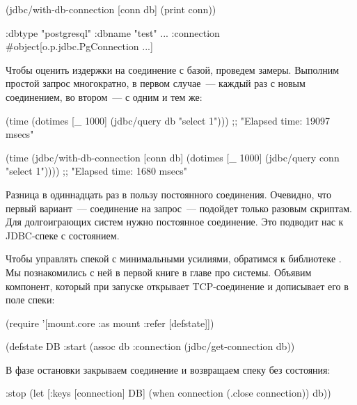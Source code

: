 \begin{english}
  \begin{clojure/lines}
(jdbc/with-db-connection [conn db]
  (print conn))

{:dbtype "postgresql"
 :dbname "test"
 ...
 :connection #object[o.p.jdbc.PgConnection ...]}
  \end{clojure/lines}
\end{english}

Чтобы оценить издержки на соединение с базой, проведем замеры. Выполним простой запрос многократно, в первом случае~--- каждый раз с новым соединением, во втором~--- с одним и тем же:

\begin{english}
  \begin{clojure}
(time (dotimes [_ 1000]
        (jdbc/query db "select 1")))
;; "Elapsed time: 19097 msecs"

(time
 (jdbc/with-db-connection [conn db]
   (dotimes [_ 1000]
     (jdbc/query conn "select 1"))))
;; "Elapsed time:  1680 msecs"
  \end{clojure}
\end{english}

Разница в одиннадцать раз в пользу постоянного соединения. Очевидно, что первый вариант~--- соединение на запрос~--- подойдет только разовым скриптам. Для долгоиграющих систем нужно постоянное соединение. Это подводит нас к JDBC-спеке с состоянием.

Чтобы управлять спекой с минимальными усилиями, обратимся к библиотеке . Мы познакомились с ней в первой книге в главе про системы. Объявим компонент, который при запуске открывает TCP-соединение и дописывает его в поле  спеки:

\begin{english}
  \begin{clojure}
(require
  '[mount.core :as mount :refer [defstate]])

(defstate DB
  :start
  (assoc db :connection
         (jdbc/get-connection db))
  \end{clojure}
\end{english}

В фазе остановки закрываем соединение и возвращаем спеку без состояния:

\begin{english}
  \begin{clojure}
  :stop
  (let [{:keys [connection]} DB]
    (when connection
      (.close connection))
    db))
  \end{clojure}
\end{english}

